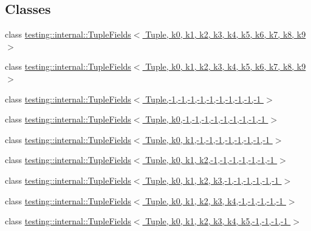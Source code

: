 \subsection*{Classes}
\begin{DoxyCompactItemize}
\item 
class \hyperlink{classtesting_1_1internal_1_1TupleFields}{testing\+::internal\+::\+Tuple\+Fields$<$ Tuple, k0, k1, k2, k3, k4, k5, k6, k7, k8, k9 $>$}
\item 
class \hyperlink{classtesting_1_1internal_1_1TupleFields}{testing\+::internal\+::\+Tuple\+Fields$<$ Tuple, k0, k1, k2, k3, k4, k5, k6, k7, k8, k9 $>$}
\item 
class \hyperlink{classtesting_1_1internal_1_1TupleFields_3_01Tuple_00-1_00-1_00-1_00-1_00-1_00-1_00-1_00-1_00-1_00-1_01_4}{testing\+::internal\+::\+Tuple\+Fields$<$ Tuple,-\/1,-\/1,-\/1,-\/1,-\/1,-\/1,-\/1,-\/1,-\/1,-\/1 $>$}
\item 
class \hyperlink{classtesting_1_1internal_1_1TupleFields_3_01Tuple_00_01k0_00-1_00-1_00-1_00-1_00-1_00-1_00-1_00-1_00-1_01_4}{testing\+::internal\+::\+Tuple\+Fields$<$ Tuple, k0,-\/1,-\/1,-\/1,-\/1,-\/1,-\/1,-\/1,-\/1,-\/1 $>$}
\item 
class \hyperlink{classtesting_1_1internal_1_1TupleFields_3_01Tuple_00_01k0_00_01k1_00-1_00-1_00-1_00-1_00-1_00-1_00-1_00-1_01_4}{testing\+::internal\+::\+Tuple\+Fields$<$ Tuple, k0, k1,-\/1,-\/1,-\/1,-\/1,-\/1,-\/1,-\/1,-\/1 $>$}
\item 
class \hyperlink{classtesting_1_1internal_1_1TupleFields_3_01Tuple_00_01k0_00_01k1_00_01k2_00-1_00-1_00-1_00-1_00-1_00-1_00-1_01_4}{testing\+::internal\+::\+Tuple\+Fields$<$ Tuple, k0, k1, k2,-\/1,-\/1,-\/1,-\/1,-\/1,-\/1,-\/1 $>$}
\item 
class \hyperlink{classtesting_1_1internal_1_1TupleFields_3_01Tuple_00_01k0_00_01k1_00_01k2_00_01k3_00-1_00-1_00-1_00-1_00-1_00-1_01_4}{testing\+::internal\+::\+Tuple\+Fields$<$ Tuple, k0, k1, k2, k3,-\/1,-\/1,-\/1,-\/1,-\/1,-\/1 $>$}
\item 
class \hyperlink{classtesting_1_1internal_1_1TupleFields_3_01Tuple_00_01k0_00_01k1_00_01k2_00_01k3_00_01k4_00-1_00-1_00-1_00-1_00-1_01_4}{testing\+::internal\+::\+Tuple\+Fields$<$ Tuple, k0, k1, k2, k3, k4,-\/1,-\/1,-\/1,-\/1,-\/1 $>$}
\item 
class \hyperlink{classtesting_1_1internal_1_1TupleFields_3_01Tuple_00_01k0_00_01k1_00_01k2_00_01k3_00_01k4_00_01k5_00-1_00-1_00-1_00-1_01_4}{testing\+::internal\+::\+Tuple\+Fields$<$ Tuple, k0, k1, k2, k3, k4, k5,-\/1,-\/1,-\/1,-\/1 $>$}
\item 

\end{DoxyCompactItemize}
